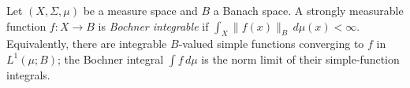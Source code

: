 
Let $(X,\Sigma,\mu)$ be a measure space and $B$ a Banach space. A strongly measurable function $f:X\to B$ is \emph{Bochner integrable} if $\int_X\|f(x)\|_B\,d\mu(x)<\infty$. Equivalently, there are integrable $B$-valued simple functions converging to $f$ in $L^1(\mu;B)$; the Bochner integral $\int f\,d\mu$ is the norm limit of their simple-function integrals.

